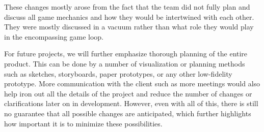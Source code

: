 \documentclass[12pt, titlepage]{article}
\begin{document}
These changes mostly arose from the fact that the team did not fully plan and discuss all game mechanics and how they would be intertwined with each other. They were mostly discussed in a vacuum rather than what role they would play in the encompassing game loop.

For future projects, we will further emphasize thorough planning of the entire product. This can be done by a number of visualization or planning methods such as sketches, storyboards, paper prototypes, or any other low-fidelity prototype. More communication with the client such as more meetings would also help iron out all the details of the project and reduce the number of changes or clarifications later on in development. However, even with all of this, there is still no guarantee that all possible changes are anticipated, which further highlights how important it is to minimize these possibilities.
\end{document}
